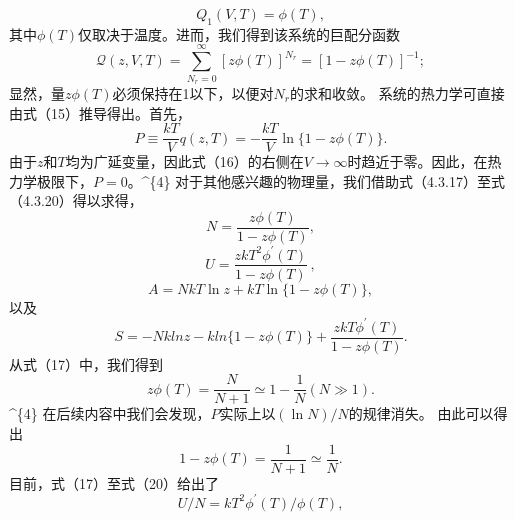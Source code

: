 \begin{equation}\tag{4.4.16}\label{eq:4.4.16}
Q _ { 1 } ( V , T ) = \phi ( T ) ,
\end{equation}
其中\(\phi(T)\)仅取决于温度。进而，我们得到该系统的巨配分函数
\begin{equation}\tag{4.4.17}\label{eq:4.4.17}
\mathcal { Q } ( z , V , T ) = \sum _ { N _ { r } = 0 } ^{\infty} [ z \phi ( T ) ] ^{N _ { r} } = [ 1 - z \phi ( T ) ] ^{- 1} ;
\end{equation}
显然，量\(z\phi(T)\)必须保持在1以下，以便对\(N_r\)的求和收敛。
系统的热力学可直接由式（15）推导得出。首先，
\begin{equation}\tag{4.4.18}\label{eq:4.4.18}
P \equiv \frac { k T } { V } q ( z , T ) = - \frac { k T } { V } \ln \{ 1 - z \phi ( T ) \} .
\end{equation}
由于\(z\)和\(T\)均为广延变量，因此式（16）的右侧在\(V \to \infty\)时趋近于零。因此，在热力学极限下，\(P = 0\)。\^{}\{4\} 对于其他感兴趣的物理量，我们借助式（4.3.17）至式（4.3.20）得以求得，
\begin{equation}\tag{4.4.19}\label{eq:4.4.19}
N = \frac { z \phi ( T ) } { 1 - z \phi ( T ) } ,
\end{equation}
\begin{equation}\tag{4.4.20}\label{eq:4.4.20}
U = \frac { z k T ^{2} \phi ^{\prime} ( T ) } { 1 - z \phi ( T ) } \, ,
\end{equation}
\begin{equation}\tag{4.4.21}\label{eq:4.4.21}
A = N k T \ln z + k T \ln \{ 1 - z \phi ( T ) \} ,
\end{equation}
以及
\begin{equation}\tag{4.4.22}\label{eq:4.4.22}
S = - N k l n z - k l n \{ 1 - z \phi ( T ) \} + \frac { z k T \phi ^{\prime} ( T ) } { 1 - z \phi ( T ) } .
\end{equation}
从式（17）中，我们得到
\begin{equation}\tag{4.4.23}\label{eq:4.4.23}
z \phi ( T ) = \frac { N } { N + 1 } \simeq 1 - \frac { 1 } { N }  ( N \gg 1 ) .
\end{equation}
\^{}\{4\} 在后续内容中我们会发现，\(P\)实际上以\((\ln N)/N\)的规律消失。
由此可以得出
\begin{equation}\tag{4.4.24}\label{eq:4.4.24}
1 - z \phi ( T ) = \frac { 1 } { N + 1 } \simeq \frac { 1 } { N } .
\end{equation}
目前，式（17）至式（20）给出了
\begin{equation}\tag{4.4.25}\label{eq:4.4.25}
U / N = k T ^{2} \phi ^{\prime} ( T ) / \phi ( T ) ,
\end{equation}
